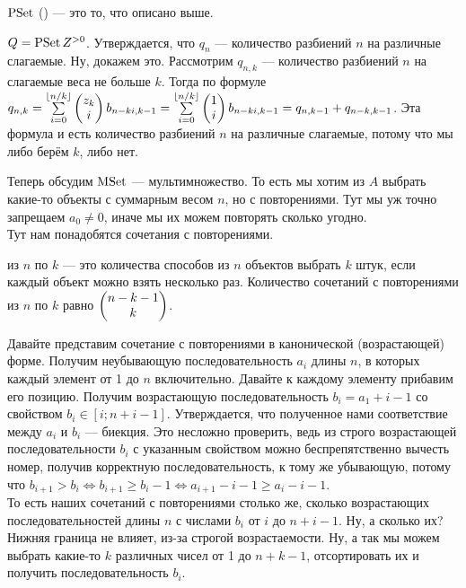 \documentclass{article}
\begin{document}
\begin{itemize}
\begin{Comment}
        \end{Comment}
        \dfn $\operatorname{PSet}$ () --- это то, что описано выше.
        \begin{Example}
            $Q=\operatorname{PSet} Z^{>0}$. Утверждается, что $q_n$ --- количество разбиений $n$ на различные слагаемые. Ну, докажем это. Рассмотрим $q_{n,k}$ --- количество разбиений $n$ на слагаемые веса не больше $k$. Тогда по формуле $q_{n,k}=\sum\limits_{i=0}^{\lfloor n/k\rfloor}\left(\begin{matrix}z_k\\i\end{matrix}\right)b_{n-ki,k-1}=\sum\limits_{i=0}^{\lfloor n/k\rfloor}\left(\begin{matrix}1\\i\end{matrix}\right)b_{n-ki,k-1}=q_{n,k-1}+q_{n-k,k-1}$. Эта формула и есть количество разбиений $n$ на различные слагаемые, потому что мы либо берём $k$, либо нет.
        \end{Example}
        \begin{Comment}
            Теперь обсудим $\operatorname{MSet}$ --- мультимножество. То есть мы хотим из $A$ выбрать какие-то объекты с суммарным весом $n$, но с повторениями. Тут мы уж точно запрещаем $a_0\neq0$, иначе мы их можем повторять сколько угодно.\\
            Тут нам понадобятся сочетания с повторениями.
        \end{Comment}
        \dfn {} из $n$ по $k$ --- это количества способов из $n$ объектов выбрать $k$ штук, если каждый объект можно взять несколько раз.
        \thm Количество сочетаний с повторениями из $n$ по $k$ равно $\left(\begin{matrix}n-k-1\\k\end{matrix}\right)$.
        \begin{Proof}
            Давайте представим сочетание с повторениями в канонической (возрастающей) форме. Получим неубывающую последовательность $a_i$ длины $n$, в которых каждый элемент от 1 до $n$ включительно. Давайте к каждому элементу прибавим его позицию. Получим возрастающую последовательность $b_i=a_1+i-1$ со свойством $b_i\in[i;n+i-1]$. Утверждается, что полученное нами соответствие между $a_i$ и $b_i$ --- биекция. Это несложно проверить, ведь из строго возрастающей последовательности $b_i$ с указанным свойством можно беспрепятственно вычесть номер, получив корректную последовательность, к тому же убывающую, потому что $b_{i+1}>b_i\Leftrightarrow b_{i+1}\geqslant b_i-1\Leftrightarrow a_{i+1}-i-1\geqslant a_i-i-1$.\\
            То есть наших сочетаний с повторениями столько же, сколько возрастающих последовательностей длины $n$ с числами $b_i$ от $i$ до $n+i-1$. Ну, а сколько их? Нижняя граница не влияет, из-за строгой возрастаемости. Ну, а так мы можем выбрать какие-то $k$ различных чисел от 1 до $n+k-1$, отсортировать их и получить последовательность $b_i$.

\end{Proof}
\end{itemize}
\end{document}
